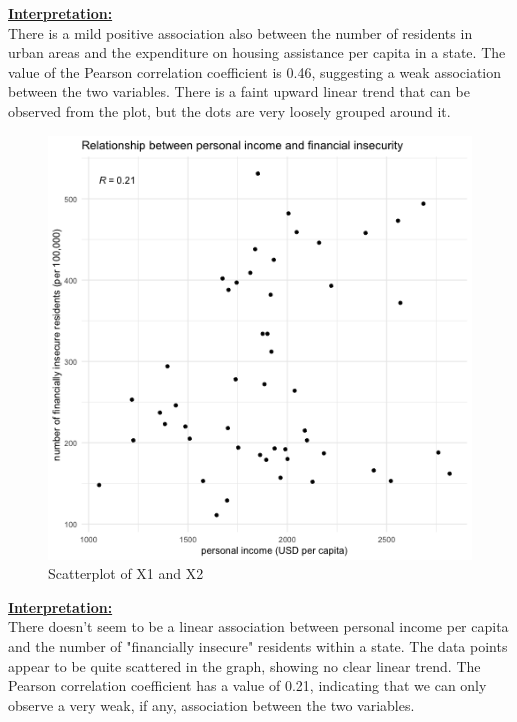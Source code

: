 \documentclass[12pt,letterpaper]{article}
\begin{document}
\vspace{.5cm}
\underline{\textbf{Interpretation:}}\\[.3cm] There is a mild positive association also between the number of residents in urban areas and the expenditure on housing assistance per capita in a state. The value of the Pearson correlation coefficient is 0.46, suggesting a weak association between the two variables. There is a faint upward linear trend that can be observed from the plot, but the dots are very loosely grouped around it. 
\newpage
 
\vspace{.5cm}
\begin{figure}[h!]\centering
	\caption{\footnotesize Scatterplot of X1 and X2}
	\label{fig:plot_4}
	\includegraphics[width=.7\textwidth]{scatter_x1_x2.png}
\end{figure}
\vspace{.5cm}
\underline{\textbf{Interpretation:}}\\[.3cm] There doesn't seem to be a linear association between personal income per capita and the number of "financially insecure" residents within a state. The data points appear to be quite scattered in the graph, showing no clear linear trend. The Pearson correlation coefficient has a value of 0.21, indicating that we can only observe a very weak, if any, association between the two variables.
\newpage
 
\vspace{.5cm}
\end{document}

